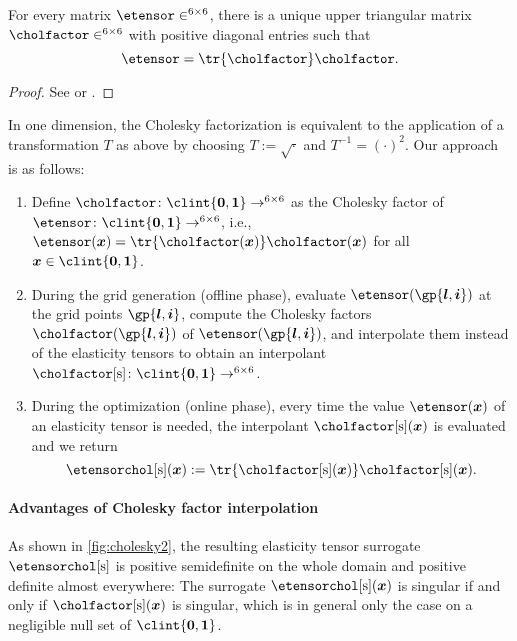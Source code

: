 \begin{proposition}
  For every \spd matrix $\etensor \in \real^{6 \times 6}$,
  there is a unique upper triangular matrix
  $\cholfactor \in \real^{6 \times 6}$
  with positive diagonal entries such that
  \begin{equation}
    \etensor
    = \tr{\cholfactor} \cholfactor.
  \end{equation}
\end{proposition}

\begin{proof}
  See \cite{Benoit24Note} or \cite{Freund07Stoer}.
\end{proof}

In one dimension, the Cholesky factorization is equivalent
to the application of a transformation $T$ as above by choosing
$T := \sqrt{\cdot}$ and $T^{-1} = (\cdot)^2$.
Our approach is as follows:
\begin{enumerate}
  \item
  Define $\cholfactor\colon \clint{\*0, \*1} \to \real^{6 \times 6}$
  as the Cholesky factor of
  $\etensor\colon \clint{\*0, \*1} \to \real^{6 \times 6}$, i.e.,
  $\etensor(\*x) = \tr{\cholfactor(\*x)} \cholfactor(\*x)$
  for all $\*x \in \clint{\*0, \*1}$.
  
  \item
  During the grid generation (offline phase),
  evaluate $\etensor(\gp{\*l,\*i})$ at the grid points $\gp{\*l,\*i}$,
  compute the Cholesky factors $\cholfactor(\gp{\*l,\*i})$ of
  $\etensor(\gp{\*l,\*i})$,
  and interpolate them instead of the elasticity tensors
  to obtain an interpolant
  $\cholfactorintp\colon \clint{\*0, \*1} \to \real^{6 \times 6}$.
  
  \item
  During the optimization (online phase),
  every time the value $\etensor(\*x)$ of an elasticity tensor is needed,
  the interpolant $\cholfactorintp(\*x)$ is evaluated and we return
  \begin{equation}
    \etensorcholintp(\*x)
    := \tr{\cholfactorintp(\*x)} \cholfactorintp(\*x).
  \end{equation}
\end{enumerate}

\paragraph{Advantages of Cholesky factor interpolation}

As shown in \cref{fig:cholesky2},
the resulting elasticity tensor surrogate $\etensorcholintp$
is positive semidefinite on the whole domain and
positive definite almost everywhere:
The surrogate $\etensorcholintp(\*x)$ is singular if and only if
$\cholfactorintp(\*x)$ is singular, which is in general
only the case on a negligible null set of $\clint{\*0, \*1}$.

